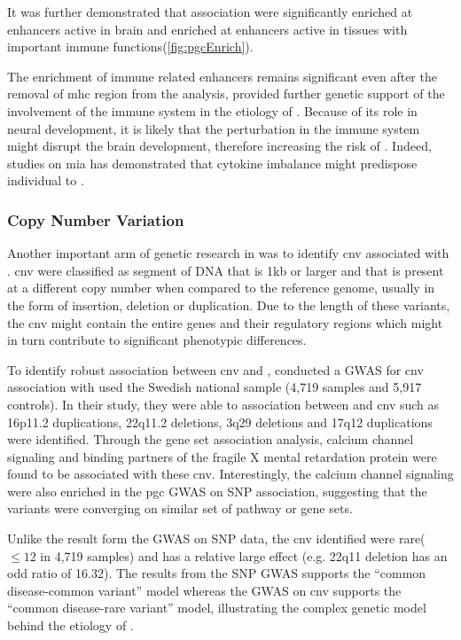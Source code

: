 	It was further demonstrated that  association were significantly enriched at enhancers active in brain and enriched at enhancers active in tissues with important immune functions(\cref{fig:pgcEnrich})\citep{Ripke2014}.
		
	The enrichment of immune related enhancers remains significant even after the removal of \gls{mhc} region from the analysis, provided further genetic support of the involvement of the immune system in the etiology of .
	Because of its role in neural development\citep{Zhao1998,Deverman2009}, it is likely that the perturbation in the immune system might disrupt the brain development, therefore increasing the risk of .
	Indeed, studies on \gls{mia} has demonstrated that cytokine imbalance might predispose individual to \citep{Meyer2009}. 
	
	\subsubsection{Copy Number Variation}
	Another important arm of genetic research in  was to identify \gls{cnv} associated with .
	\gls{cnv} were classified as segment of DNA that is 1kb or larger and that is present at a different copy number when compared to the reference genome, usually in the form of insertion, deletion or duplication\citep{Feuk2006}.
	Due to the length of these variants, the \gls{cnv} might contain the entire genes and their regulatory regions which might in turn contribute to significant phenotypic differences\citep{Feuk2006}.
	
	To identify robust association between \gls{cnv} and , \cite{Szatkiewicz2014} conducted a \gls{GWAS} for \gls{cnv} association with  used the Swedish national sample (4,719  samples and 5,917 controls).
	In their study, they were able to association between  and \gls{cnv} such as 16p11.2 duplications, 22q11.2 deletions, 3q29 deletions and 17q12 duplications were identified.
	Through the gene set association analysis, calcium channel signaling and binding partners of the fragile X mental retardation protein were found to be associated with these \gls{cnv}\citep{Szatkiewicz2014}.
	Interestingly, the calcium channel signaling were also enriched in the \gls{pgc} \gls{GWAS} on \gls{SNP} association, suggesting that the variants were converging on similar set of pathway or gene sets. 
	
	Unlike the result form the \gls{GWAS} on \gls{SNP} data, the \gls{cnv} identified were rare($\le12$ in 4,719 samples) and has a relative large effect (e.g. 22q11 deletion has an odd ratio of 16.32\citep{Szatkiewicz2014}). 
	The results from the \gls{SNP} \gls{GWAS} supports the ``common disease-common variant'' model whereas the \gls{GWAS} on \gls{cnv} supports the ``common disease-rare variant'' model, illustrating the complex genetic model behind the etiology of .
	
